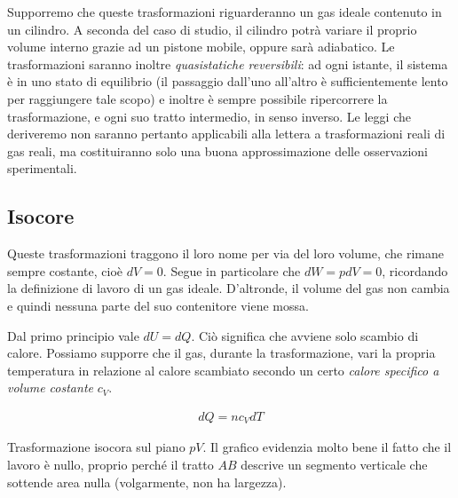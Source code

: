 Supporremo che queste trasformazioni riguarderanno un gas ideale
contenuto in un cilindro. A seconda del caso di studio, il cilindro
potrà variare il proprio volume interno grazie ad un pistone mobile,
oppure sarà adiabatico. Le trasformazioni saranno inoltre \textit{quasistatiche
reversibili}: ad ogni istante, il sistema è in uno stato di
equilibrio (il passaggio dall'uno all'altro è sufficientemente lento
per raggiungere tale scopo) e inoltre è sempre possibile ripercorrere
la trasformazione, e ogni suo tratto intermedio, in senso inverso.
Le leggi che deriveremo non saranno pertanto applicabili alla lettera
a trasformazioni reali di gas reali, ma costituiranno solo una buona
approssimazione delle osservazioni sperimentali.


\subsection{Isocore}
Queste trasformazioni traggono il loro nome per via del loro volume,
che rimane sempre costante, cioè $dV = 0$. Segue in particolare che
$dW = pdV = 0$, ricordando la definizione di lavoro di un gas ideale.
D'altronde, il volume del gas non cambia e quindi nessuna parte del
suo contenitore viene mossa.

Dal primo principio vale $dU = dQ$. Ciò significa che avviene solo
scambio di calore. Possiamo supporre che il gas, durante la trasformazione,
vari la propria temperatura in relazione al calore scambiato secondo
un certo \textit{calore specifico a volume costante} $c_V$.

\begin{align}
    dQ = nc_VdT
\end{align}

\begin{marginfigure}
    \begin{center}
        \def\xmax{3}
        \def\ymax{2.5}
    \end{center}
    \caption{Trasformazione isocora sul piano $pV$. Il grafico evidenzia
    molto bene il fatto che il lavoro è nullo, proprio perché il tratto
    $AB$ descrive un segmento verticale che sottende area nulla (volgarmente, non
    ha largezza).}
\end{marginfigure}

